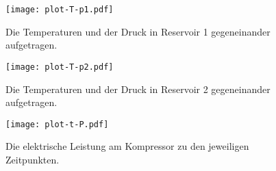 \begin{figure}
  \centering
  \texttt{[image: plot-T-p1.pdf]}
  \caption{Die Temperaturen und der Druck in Reservoir 1 gegeneinander aufgetragen.}
  \label{fig:plot_temp-druck1}
\end{figure}

\begin{figure}
  \centering
  \texttt{[image: plot-T-p2.pdf]}
  \caption{Die Temperaturen und der Druck in Reservoir 2 gegeneinander aufgetragen.}
  \label{fig:plot_temp-druck2}
\end{figure}



\begin{figure}
  \centering
  \texttt{[image: plot-t-P.pdf]}
  \caption{Die elektrische Leistung am Kompressor zu den jeweiligen Zeitpunkten.}
  \label{fig:plot_zeit-druck}
\end{figure}